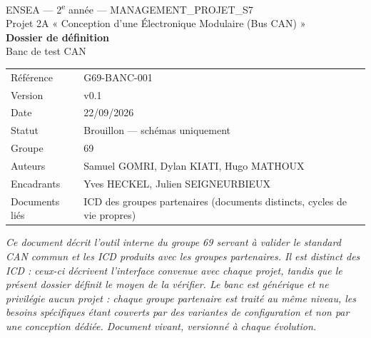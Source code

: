 \documentclass[11pt,a4paper]{article}
\newcommand{\docref}{G69-BANC-001}
\newcommand{\docversion}{v0.1}
\newcommand{\docdate}{22/09/2026}
\newcommand{\docstatus}{Brouillon — schémas uniquement}
\begin{document}
\begin{titlepage}
\centering
\vspace*{1.5cm}
{\large ENSEA — 2\textsuperscript{e} année — MANAGEMENT\_PROJET\_S7}\\[0.4cm]
{\large Projet 2A « Conception d'une Électronique Modulaire (Bus CAN) »}\\[2.5cm]

{\Huge\bfseries Dossier de définition}\\[0.5cm]
{\LARGE Banc de test CAN}\\[2cm]

\begin{tabular}{ll}
\toprule
Référence & \docref \\
Version & \docversion \\
Date & \docdate \\
Statut & \docstatus \\
\midrule
Groupe & 69 \\
Auteurs & Samuel GOMRI, Dylan KIATI, Hugo MATHOUX \\
Encadrants & Yves HECKEL, Julien SEIGNEURBIEUX \\
\midrule
Documents liés & ICD des groupes partenaires (documents distincts, cycles de vie propres) \\
\bottomrule
\end{tabular}

\vfill
\begin{minipage}{0.85\textwidth}
\small\itshape
Ce document décrit l'outil interne du groupe 69 servant à valider le standard CAN commun
et les ICD produits avec les groupes partenaires. Il est distinct des ICD : ceux-ci
décrivent l'interface convenue avec chaque projet, tandis que le présent dossier définit
le moyen de la vérifier. Le banc est générique et ne privilégie aucun projet : chaque
groupe partenaire est traité au même niveau, les besoins spécifiques étant couverts par
des variantes de configuration et non par une conception dédiée. Document vivant,
versionné à chaque évolution.
\end{minipage}
\vspace{1cm}
\end{titlepage}

\tableofcontents
\newpage{}

\end{document}
